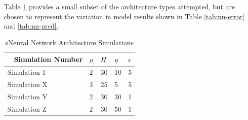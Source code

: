 \documentclass[conference]{IEEEtran}
\begin{document}
{%



Table \ref{tab:nn-sims} provides a small subset of the architecture types attempted, but are chosen to represent the variation in model results shown in Table \ref{tab:nn-error} and \ref{tab:nn-pred}.
\begin{table}[H]
	\centering
    \begin{tabular}{|l|l|l|l|l|}
    \hline
    ~    \textbf{Simulation Number} & \textbf{$\mu$} & \textbf{$H$} & \textbf{$\eta$} & \textbf{$\epsilon$}\\ \hline
    Simulation 1 & 2 & 30 & 10 & 5\\ \hline
    Simulation X & 3 & 25 & 5 & 5 \\ \hline
    Simulation Y & 2 & 30 & 30 & 1 \\ \hline
    Simulation Z & 2 & 30 & 50 & 1 \\ \hline
    \end{tabular}
    \caption {sNeural Network Architecture Simulations}
    \label{tab:nn-sims}
\end{table}

}
\end{document}

